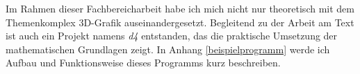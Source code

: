 Im Rahmen dieser Fachbereicharbeit habe ich mich nicht nur theoretisch mit dem Themenkomplex 3D-Grafik auseinandergesetzt. Begleitend zu der Arbeit am Text ist auch ein Projekt namens \emph{d4} entstanden, das die praktische Umsetzung der mathematischen Grundlagen zeigt. In Anhang \ref{beispielprogramm} werde ich Aufbau und Funktionsweise dieses Programms kurz beschreiben.

